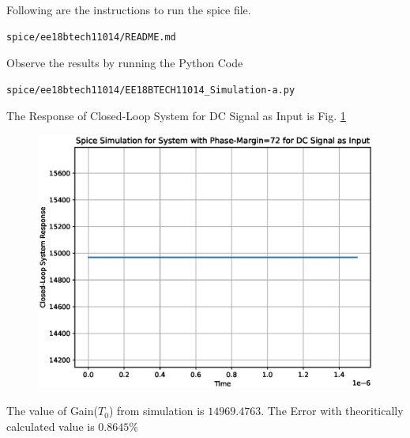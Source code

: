 \begin{enumerate}[label=\thesection.\arabic*.,ref=\thesection.\theenumi]
Following are the instructions to run the spice file.
\begin{lstlisting}
spice/ee18btech11014/README.md
\end{lstlisting}

Observe the results by running the Python Code
\begin{lstlisting}
spice/ee18btech11014/EE18BTECH11014_Simulation-a.py
\end{lstlisting}

The Response of Closed-Loop System for DC Signal as Input is Fig. \ref{fig:DC}
\begin{figure}[ht!]
	\begin{center}
		\includegraphics[width=\columnwidth]{./figs/ee18btech11014/ee18btech11014_Spice_Result_PM=72.eps}
	\end{center}
	\caption{}
	\label{fig:DC}
\end{figure}

The value of Gain($T_{0}$) from simulation is $14969.4763$. The Error with theoritically calculated value is $0.8645\%$

\end{enumerate}
